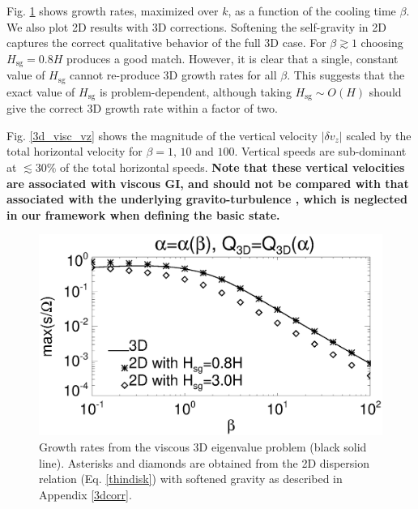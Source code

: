Fig. \ref{3d_visc} shows growth rates, maximized over $k$, as a
function of the cooling time $\beta$. We also plot 2D results with 3D
corrections. Softening the self-gravity in 2D captures the correct 
qualitative behavior of the full 3D case. For $\beta\gtrsim 1$
choosing $H_\mathrm{sg}=0.8H$ produces a good match. However, it is
clear that a single, constant value of $H_\mathrm{sg}$ cannot
re-produce 3D growth rates for all $\beta$. This suggests that the
exact value of $H_\mathrm{sg}$ is problem-dependent, although taking 
$H_\mathrm{sg}\sim O(H)$ should give the correct 3D growth rate within 
a factor of two. 


Fig. \ref{3d_visc_vz} shows the magnitude of the vertical velocity 
$|\delta v_z|$ scaled by the total horizontal velocity for $\beta =
1,\,10$ and $100$. Vertical speeds are sub-dominant at $\lesssim 30\%$
of the total horizontal speeds. 
{\bf Note that these vertical velocities are associated with viscous
  GI, and should not be compared with that associated with the
  underlying gravito-turbulence \citep[e.g.][their Fig. 7]{shi14},
  which is neglected in our framework when defining the basic state.   
}

\begin{figure}
  \includegraphics[width=\linewidth,clip=true,trim=0cm 0.cm 0.cm
    0.0cm]{figures/growth_visc3d}
  \caption{Growth rates from the viscous 3D eigenvalue problem (black solid
    line). Asterisks and diamonds are obtained from the 2D dispersion
    relation (Eq. \ref{thindisk}) with softened gravity as described
    in Appendix \ref{3dcorr}. \label{3d_visc}} 
\end{figure}



